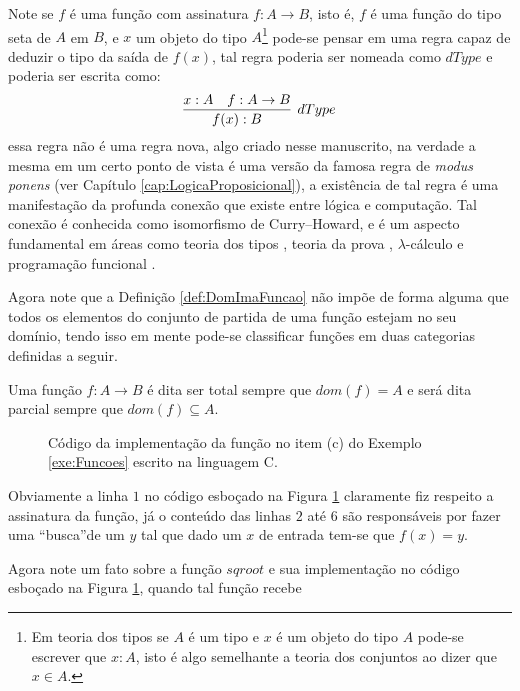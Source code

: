 Note se $f$ é uma função com assinatura $f: A \rightarrow B$, isto é, $f$ é uma função do tipo seta de $A$ em $B$, e $x$ um objeto do tipo $A$\footnote{Em teoria dos tipos \cite{nederpelt2014, thompson1999} se $A$ é um tipo e $x$ é um objeto do tipo $A$ pode-se escrever que $x:A$, isto é algo semelhante a teoria dos conjuntos ao dizer que $x \in A$.} pode-se pensar em uma regra capaz de deduzir o tipo da saída de $f(x)$, tal regra poderia ser nomeada como $dType$ e poderia ser escrita como:
\begin{equation*}
	\infer[dType]{f(x):B}{x:A & f:A \rightarrow B}
\end{equation*}
essa regra não é uma regra nova, algo criado nesse manuscrito, na verdade a mesma em um certo ponto de vista é uma versão da famosa regra de \textit{modus ponens} (ver Capítulo \ref{cap:LogicaProposicional}), a existência de tal regra é uma manifestação da profunda conexão que existe entre lógica e computação. Tal conexão é conhecida como isomorfismo de Curry–Howard, e é um aspecto fundamental em áreas como teoria dos tipos \cite{nederpelt2014, thompson1999}, teoria da prova \cite{nederpelt2014, sergey2014}, $\lambda$-cálculo \cite{bare1984, henk1992, bimbo2019} e programação funcional \cite{thompson1999, fmcbook}.

Agora note que a Definição \ref{def:DomImaFuncao} não impõe de forma alguma que todos os elementos do conjunto de partida de uma função estejam no seu domínio, tendo isso em mente pode-se classificar funções em duas categorias definidas a seguir.

\begin{definition}
	Uma função $f: A \rightarrow B$ é dita ser total sempre que $dom(f) = A$ e será dita parcial sempre que $dom(f) \subseteq A$.
\end{definition}


\begin{figure}[h]
	
	\caption{Código da implementação da função no item (c) do Exemplo \ref{exe:Funcoes} escrito na linguagem C.}
	\label{fig:FuncaoSqrt}
\end{figure}

\begin{remark}
	Obviamente a linha $1$ no código esboçado na Figura \ref{fig:FuncaoSqrt} claramente fiz respeito a assinatura da função, já o conteúdo das linhas $2$ até $6$ são responsáveis por fazer uma ``busca''de um $y$ tal que dado um $x$ de entrada tem-se que $f(x) = y$.
\end{remark}

Agora note um fato sobre a função $sqroot$ e sua implementação no código esboçado na Figura \ref{fig:FuncaoSqrt}, quando tal função recebe 


